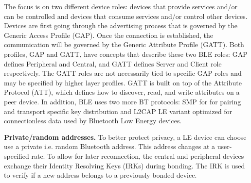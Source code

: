 The focus is on two different device roles:  devices that provide services and/or can be controlled and devices that consume services and/or control other devices. Devices are first going through the advertising process that is governed by the Generic Access Profile (GAP). Once the connection is established, the communication will be governed by the Generic Attribute Profile (GATT). Both profiles, GAP and GATT, have concepts that describe these two BLE roles:  GAP defines Peripheral and Central, and GATT defines Server and Client role respectively. The GATT roles are not necessarily tied to specific GAP roles and may be specified by higher layer profiles. GATT is built on top of the Attribute Protocol (ATT), which defines how to discover, read, and write attributes on a peer device. In addition, BLE uses two more BT protocols: SMP for for pairing and transport specific key distribution and L2CAP LE variant optimized for connectionless data used by Bluetooth Low Energy devices. 

\textbf{Private/random addresses.}
To better protect privacy, a LE device can choose use a private i.e. random Bluetooth address. This address changes at a user-specified rate. To allow for later reconnection, the central and peripheral devices exchange their Identity Resolving Keys (IRKs) during bonding. The IRK is used to verify if a new address belongs to a previously bonded device.

